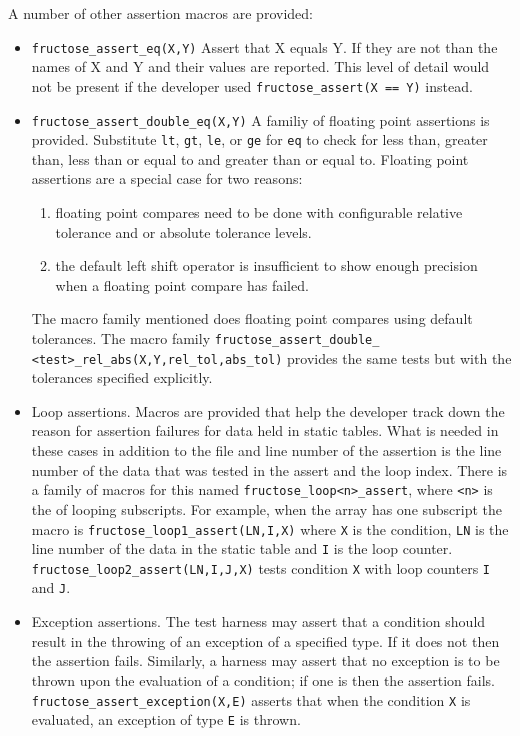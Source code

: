 \documentclass{book}
\begin{document}
A number of other assertion macros are provided:

\begin{itemize}
\item {\tt fructose\_assert\_eq(X,Y)}\hfil\break
Assert that X equals Y. If they are not than the names
of X and Y and their values are reported.
This level of detail would not be present if the
developer used\hfil\break
{\tt fructose\_assert(X == Y)} instead.

\item {\tt fructose\_assert\_double\_eq(X,Y)}\hfil\break
A familiy of floating point assertions is provided.
Substitute {\tt lt}, {\tt gt},
{\tt le}, or {\tt ge} for {\tt eq} to check for less than,
greater than, less than or equal to and greater than or
equal to.
Floating point assertions are a special case for two reasons:
\begin{enumerate}
\item floating point compares need to be done with configurable relative
tolerance and or absolute tolerance levels. 
\item the default left shift operator is insufficient to show enough
precision when a floating point compare has failed. 
\end{enumerate}
The macro family mentioned 
does floating point compares using default tolerances.
The macro family
{\tt fructose\_assert\_double\_}
{\tt<test>\_rel\_abs(X,Y,rel\_tol,abs\_tol)}
provides the same tests but with the tolerances specified explicitly.

\item Loop assertions. \hfil\break
Macros are provided that help the developer track down the
reason for assertion failures for data held in static tables.
What is needed in these cases in addition to the file and line
number of the assertion is the line number of the data that
was tested in the assert and the loop index.
There is a family of macros for this named
{\tt fructose\_loop<n>\_assert}, where {\tt <n>} is the
of looping subscripts. For example, when the array has one subscript
the macro is {\tt fructose\_loop1\_assert(LN,I,X)}
where {\tt X} is the condition, {\tt LN} is the line number
of the data in the static table and {\tt I} is the loop counter.
{\tt fructose\_loop2\_assert(LN,I,J,X)} tests condition {\tt X}
with loop counters {\tt I} and {\tt J}.

\item Exception assertions.\hfil\break
The test harness may assert that a condition should result in
the throwing of an exception of a specified type. If it does not
then the assertion fails. Similarly, a harness may assert that
no exception is to be thrown upon the evaluation of a condition;
if one is then the assertion fails.
{\tt fructose\_assert\_exception(X,E)} asserts that when
the condition {\tt X} is evaluated, an exception of type {\tt E}
is thrown.

\end{itemize}
\end{document}
